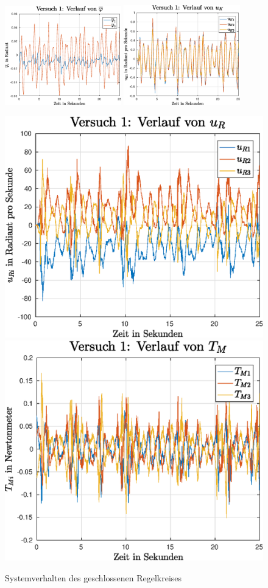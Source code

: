 \begin{figure}[h!]
\centering
\includegraphics[width=0.45\textwidth]{img/exp1_phi.eps}
\includegraphics[width=0.45\textwidth]{img/exp1_uk.eps}
\vspace{0.5cm}

\includegraphics[width=0.45\linewidth]{img/exp1_ur.eps}
\includegraphics[width=0.45\linewidth]{img/exp1_tm.eps}
\caption{Systemverhalten des geschlossenen Regelkreises}
\end{figure}
